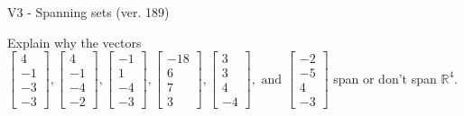 \begin{exercise}
  \begin{exerciseTitle}V3 - Spanning sets (ver. 189)\end{exerciseTitle}
  \begin{exerciseStatement}
    Explain why the vectors \(\left[\begin{array}{r}
4 \\
-1 \\
-3 \\
-3
\end{array}\right] , \left[\begin{array}{r}
4 \\
-1 \\
-4 \\
-2
\end{array}\right] , \left[\begin{array}{r}
-1 \\
1 \\
-4 \\
-3
\end{array}\right] , \left[\begin{array}{r}
-18 \\
6 \\
7 \\
3
\end{array}\right] , \left[\begin{array}{r}
3 \\
3 \\
4 \\
-4
\end{array}\right] , \text{ and } \left[\begin{array}{r}
-2 \\
-5 \\
4 \\
-3
\end{array}\right]\) span or don't span \(\mathbb{R}^4\). 
	



\end{exerciseStatement}
\end{exercise}
